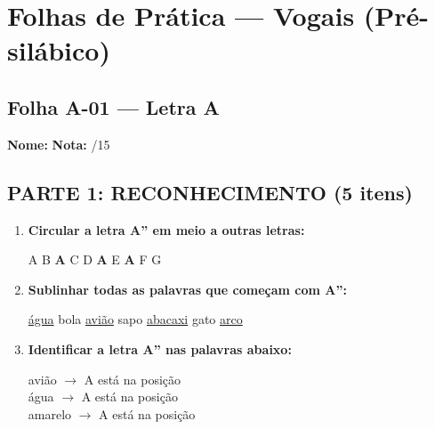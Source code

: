 
\section{Folhas de Prática --- Vogais (Pré-silábico)}


\subsection{Folha A-01 --- Letra A}

\begin{exercicio}

\noindent\textbf{Nome:} \underline{\hspace{4cm}} \quad \textbf{Nota:} \underline{\hspace{1cm}}/15

\subsection*{PARTE 1: RECONHECIMENTO (5 itens)}

\begin{enumerate}
  \item \textbf{Circular a letra A'' em meio a outras letras:}
  \begin{center}
  A \quad B \quad \textbf{A} \quad C \quad D \quad \textbf{A} \quad E \quad \textbf{A} \quad F \quad G
  \end{center}

  \item \textbf{Sublinhar todas as palavras que começam com A'':}
  \begin{center}
  \uline{água} \quad bola \quad \uline{avião} \quad sapo \quad \uline{abacaxi} \quad gato \quad \uline{arco}
  \end{center}

  \item \textbf{Identificar a letra A'' nas palavras abaixo:}
  \begin{center}
  avião $\rightarrow$ A está na posição \underline{\hspace{1cm}} \\
  água $\rightarrow$ A está na posição \underline{\hspace{1cm}} \\
  amarelo $\rightarrow$ A está na posição \underline{\hspace{1cm}}
  \end{center}


\end{enumerate}
\end{exercicio}
